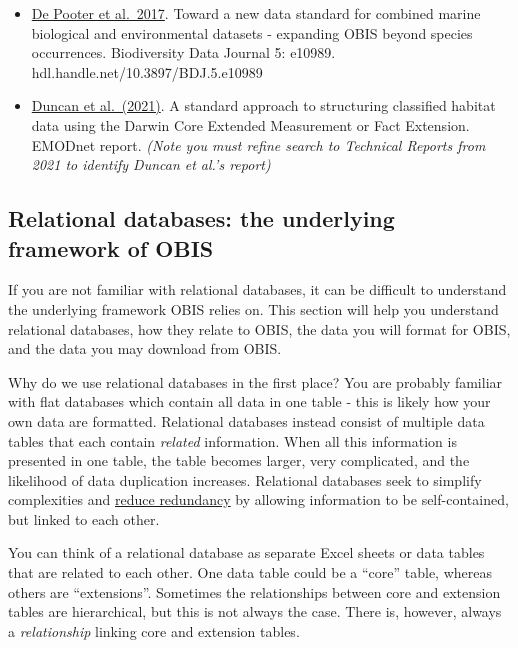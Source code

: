 \documentclass[
  letterpaper,
  DIV=11,
  numbers=noendperiod,
  oneside]{scrreprt}
\providecommand{\tightlist}{%
  \setlength{\itemsep}{0pt}\setlength{\parskip}{0pt}}\usepackage{longtable,booktabs,array}
\begin{document}
\begin{itemize}
\tightlist
\item
  \href{https://bdj.pensoft.net/articles.php?id=10989}{De Pooter et
  al.~2017}. Toward a new data standard for combined marine biological
  and environmental datasets - expanding OBIS beyond species
  occurrences. Biodiversity Data Journal 5: e10989.
  hdl.handle.net/10.3897/BDJ.5.e10989
\item
  \href{https://emodnet.ec.europa.eu/en/reports?field_emodnet_lot_value\%5B\%5D=seabed_habitats\#h3298bcd0a15741a8a0ac1c8b4576f7c5}{Duncan
  et al.~(2021)}. A standard approach to structuring classified habitat
  data using the Darwin Core Extended Measurement or Fact Extension.
  EMODnet report. \emph{(Note you must refine search to Technical
  Reports from 2021 to identify Duncan et al.'s report)}
\end{itemize}

\hypertarget{relational-databases-the-underlying-framework-of-obis}{%
\subsection{Relational databases: the underlying framework of
OBIS}\label{relational-databases-the-underlying-framework-of-obis}}

If you are not familiar with relational databases, it can be difficult
to understand the underlying framework OBIS relies on. This section will
help you understand relational databases, how they relate to OBIS, the
data you will format for OBIS, and the data you may download from OBIS.

Why do we use relational databases in the first place? You are probably
familiar with flat databases which contain all data in one table - this
is likely how your own data are formatted. Relational databases instead
consist of multiple data tables that each contain \emph{related}
information. When all this information is presented in one table, the
table becomes larger, very complicated, and the likelihood of data
duplication increases. Relational databases seek to simplify
complexities and \protect\hyperlink{how-to-avoid-redundancy}{reduce
redundancy} by allowing information to be self-contained, but linked to
each other.

You can think of a relational database as separate Excel sheets or data
tables that are related to each other. One data table could be a
``core'' table, whereas others are ``extensions''. Sometimes the
relationships between core and extension tables are hierarchical, but
this is not always the case. There is, however, always a
\emph{relationship} linking core and extension tables.
\end{document}
